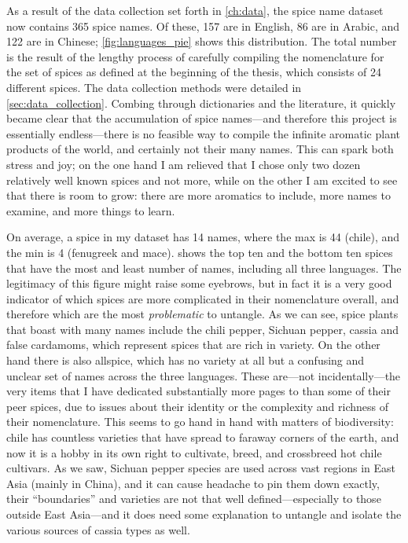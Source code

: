 As a result of the data collection set forth in \cref{ch:data}, the spice name dataset now contains 365 spice names. Of these, 157 are in English, 86 are in Arabic, and 122 are in Chinese; \cref{fig:languages_pie} shows this distribution.
The total number is the result of the lengthy process of carefully compiling the nomenclature for the set of spices as defined at the beginning of the thesis, which consists of 24 different spices. The data collection methods were detailed in \cref{sec:data_collection}. Combing through dictionaries and the literature, it quickly became clear that the accumulation of spice names---and therefore this project is essentially endless---there is no feasible way to compile the infinite aromatic plant products of the world, and certainly not their many names. This can spark both stress and joy; on the one hand I am relieved that I chose only two dozen relatively well known spices and not more, while on the other I am excited to see that there is room to grow: there are more aromatics to include, more names to examine, and more things to learn.
 
On average, a spice in my dataset has 14 names, where the max is 44 (chile), and the min is 4 (fenugreek and mace).  shows the top ten and the bottom ten spices that have the most and least number of names, including all three languages. The legitimacy of this figure might raise some eyebrows, but in fact it is a very good indicator of which spices are more complicated in their nomenclature overall, and therefore which are the most \textit{problematic} to untangle. As we can see, spice plants that boast with many names include the chili pepper, Sichuan pepper, cassia and false cardamoms, which represent spices that are rich in variety. On the other hand there is also allspice, which has no variety at all but a confusing and unclear set of names across the three languages. These are---not incidentally---the very items that I have dedicated substantially more pages to than some of their peer spices, due to issues about their identity or the complexity and richness of their nomenclature. This seems to go hand in hand with matters of biodiversity: chile has countless varieties that have spread to faraway corners of the earth, and now it is a hobby in its own right to cultivate, breed, and crossbreed hot chile cultivars. As we saw, Sichuan pepper species are used across vast regions in East Asia (mainly in China), and it can cause headache to pin them down exactly, their ``boundaries'' and varieties are not that well defined---especially to those outside East Asia---and it does need some explanation to untangle and isolate the various sources of cassia types as well.

